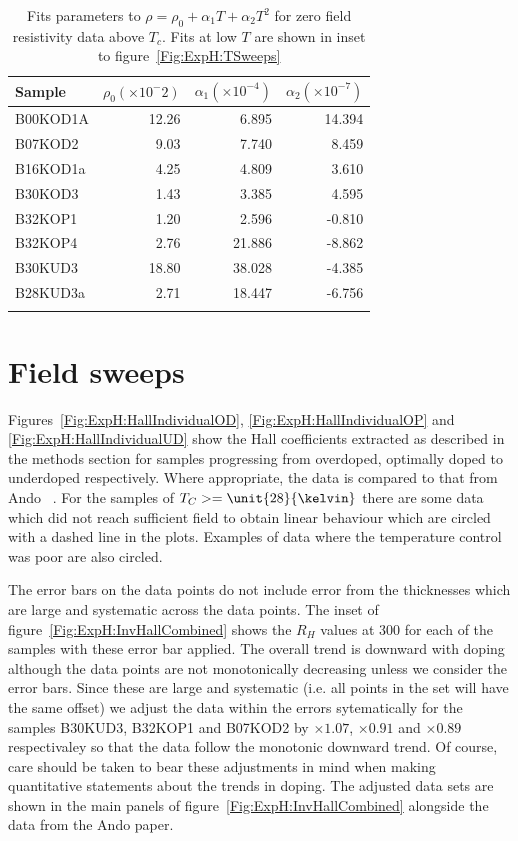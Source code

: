 \begin{table}
	\begin{center}
       	\caption{Fits parameters to $\rho = \rho_0 + \alpha_1T + \alpha_2T^2$ for zero field resistivity data above $T_c$. Fits at low $T$ are shown in inset to figure~\ref{Fig:ExpH:TSweeps}}
		\begin{tabular}[htbp]{lrrr}
\toprule
Sample		& $\rho_0 (\times10^-2)$	& $\alpha_1 (\times10^{-4})$	& $\alpha_2 (\times10^{-7})$	\\
\midrule
B00KOD1A	& 12.26		& 6.895		& 14.394		\\
B07KOD2		& 9.03		& 7.740		& 8.459			\\
B16KOD1a	& 4.25		& 4.809		& 3.610			\\
B30KOD3		& 1.43		& 3.385		& 4.595			\\
B32KOP1		& 1.20		& 2.596		& -0.810		\\
B32KOP4		& 2.76		& 21.886	& -8.862		\\
B30KUD3		& 18.80		& 38.028	& -4.385		\\
B28KUD3a	& 2.71		& 18.447	& -6.756		\\
\bottomrule
		\label{Table:ExpH:TSweepFitsParams}
		\end{tabular}
	\end{center}
\end{table}

\section{Field sweeps}

Figures~\ref{Fig:ExpH:HallIndividualOD}, \ref{Fig:ExpH:HallIndividualOP} and \ref{Fig:ExpH:HallIndividualUD} show the Hall coefficients extracted as described in the methods section for samples progressing from overdoped, optimally doped to underdoped respectively. Where appropriate, the data is compared to that from Ando \etal~\cite{Ando1999}. For the samples of $T_C >= \unit{28}{\kelvin}$ there are some data which did not reach sufficient field to obtain linear behaviour which are circled with a dashed line in the plots. Examples of data where the temperature control was poor are also circled.

The error bars on the data points do not include error from the thicknesses which are large and systematic across the data points. The inset of figure~\ref{Fig:ExpH:InvHallCombined} shows the $R_H$ values at \unit{300}{\kelvin} for each of the samples with these error bar applied. The overall trend is downward with doping although the data points are not monotonically decreasing unless we consider the error bars. Since these are large and systematic (i.e. all points in the set will have the same offset) we adjust the data within the errors sytematically for the samples B30KUD3, B32KOP1 and B07KOD2 by $\times1.07$, $\times0.91$ and $\times0.89$ respectivaley so that the data follow the monotonic downward trend. Of course, care should be taken to bear these adjustments in mind when making quantitative statements about the trends in doping. The adjusted data sets are shown in the main panels of figure~\ref{Fig:ExpH:InvHallCombined} alongside the data from the Ando paper.

